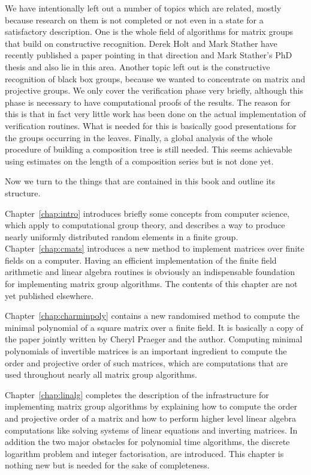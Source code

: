 We have intentionally left out a number of topics which are related, mostly
because research on them is not completed or not even in a state for a
satisfactory description. One is
the whole field of algorithms for matrix groups that build on constructive
recognition. Derek Holt and Mark Stather have recently published a paper
\cite{HoltStather} pointing in that direction and Mark Stather's PhD thesis
\cite{StatherPhd} and \cite{StatherSylow} also lie in this area. 
Another topic left out is the
constructive recognition of black box groups, because we wanted to
concentrate on matrix and projective groups. We only cover the
verification phase very briefly, although this phase is necessary to
have computational proofs of the results. The reason for this is that in
fact very little work has been done on the actual implementation of
verification routines. What is needed for this is basically good
presentations for the groups occurring in the leaves. 
%
Finally, a global analysis of the
whole procedure of building a composition tree is still needed. This seems
achievable using estimates on the length of a composition series but is not
done yet.

Now we turn to the things that are contained in this book and
outline its structure. 

Chapter~\ref{chap:intro} introduces briefly some concepts from computer
science, which apply to computational group theory, and describes a
way to produce nearly uniformly distributed random elements in a
finite group. Chapter~\ref{chap:cmats} introduces a new method to
implement matrices over finite fields on a computer. Having an efficient
implementation of the finite field arithmetic and linear algebra
routines is obviously an indispensable foundation for implementing
matrix group algorithms. The contents of this chapter are not yet
published elsewhere.

Chapter~\ref{chap:charminpoly} contains a new randomised method to
compute the minimal polynomial of a square matrix over a finite field.
It is basically a copy of the paper \cite{minpolypaper} jointly
written by Cheryl Praeger and the author. Computing minimal
polynomials of invertible matrices is an important ingredient to compute the
order and projective order of such matrices, which are computations
that are used throughout nearly all matrix group algorithms.

Chapter~\ref{chap:linalg} completes the description of the
infrastructure for implementing matrix group algorithms by explaining
how to compute the order and projective order of a matrix and how to
perform higher level linear algebra computations like solving systems
of linear equations and inverting matrices. In addition the two
major obstacles for polynomial time algorithms, the discrete logarithm
problem and integer factorisation, are introduced. This chapter is
nothing new but is needed for the sake of completeness.

